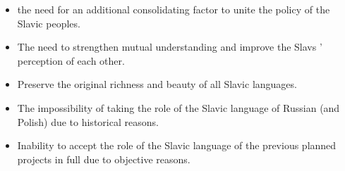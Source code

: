 \begin{itemize}
	\item the need for an additional consolidating factor to unite the policy of the Slavic peoples.
	\item The need to strengthen mutual understanding and improve the Slavs ' perception of each other.
	\item Preserve the original richness and beauty of all Slavic languages.
	\item The impossibility of taking the role of the Slavic language of Russian (and Polish) due to historical reasons.
	\item Inability to accept the role of the Slavic language of the previous planned projects in full due to objective reasons.
\end{itemize}






